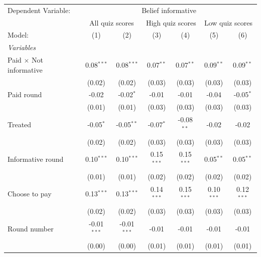 \begingroup
\centering
\begin{tabular}{lcccccc}
   \tabularnewline \midrule \midrule
   Dependent Variable: & \multicolumn{6}{c}{Belief informative}\\
    & \multicolumn{2}{c}{All quiz scores} & \multicolumn{2}{c}{High quiz scores} & \multicolumn{2}{c}{Low quiz scores} \\ 
   Model:                         & (1)           & (2)           & (3)          & (4)          & (5)          & (6)\\  
   \midrule
   \emph{Variables}\\
   Paid $\times$ Not informative  & 0.08$^{***}$  & 0.08$^{***}$  & 0.07$^{**}$  & 0.07$^{**}$  & 0.09$^{**}$  & 0.09$^{**}$\\   
                                  & (0.02)        & (0.02)        & (0.03)       & (0.03)       & (0.03)       & (0.03)\\   
   Paid round                     & -0.02         & -0.02$^{*}$   & -0.01        & -0.01        & -0.04        & -0.05$^{*}$\\   
                                  & (0.01)        & (0.01)        & (0.03)       & (0.03)       & (0.03)       & (0.03)\\   
   Treated                        & -0.05$^{*}$   & -0.05$^{**}$  & -0.07$^{*}$  & -0.08$^{**}$ & -0.02        & -0.02\\   
                                  & (0.02)        & (0.02)        & (0.03)       & (0.03)       & (0.03)       & (0.03)\\   
   Informative round              & 0.10$^{***}$  & 0.10$^{***}$  & 0.15$^{***}$ & 0.15$^{***}$ & 0.05$^{**}$  & 0.05$^{**}$\\   
                                  & (0.01)        & (0.01)        & (0.02)       & (0.02)       & (0.02)       & (0.02)\\   
   Choose to pay                  & 0.13$^{***}$  & 0.13$^{***}$  & 0.14$^{***}$ & 0.15$^{***}$ & 0.10$^{***}$ & 0.12$^{***}$\\   
                                  & (0.02)        & (0.02)        & (0.03)       & (0.03)       & (0.03)       & (0.03)\\   
   Round number                   & -0.01$^{***}$ & -0.01$^{***}$ & -0.01        & -0.01        & -0.01        & -0.01\\   
                                  & (0.00)        & (0.00)        & (0.01)       & (0.01)       & (0.01)       & (0.01)\\   

\end{tabular}
